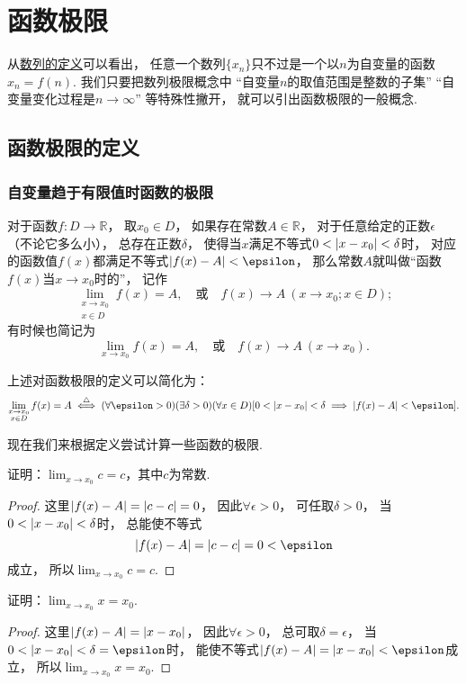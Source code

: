 \section{函数极限}
从\hyperref[definition:数列.数列的定义]{数列的定义}可以看出，
任意一个数列\(\{x_n\}\)只不过是一个以\(n\)为自变量的函数\(x_n = f(n)\).
我们只要把数列极限概念中
“自变量\(n\)的取值范围是整数的子集”
“自变量变化过程是\(n\to\infty\)”
等特殊性撇开，
就可以引出函数极限的一般概念.

\subsection{函数极限的定义}
\subsubsection*{自变量趋于有限值时函数的极限}
\begin{definition}\label{definition:极限.函数极限的定义1}
对于函数\(f\colon D\to\mathbb{R}\)，
取\(x_0 \in D\)，
如果存在常数\(A\in\mathbb{R}\)，
对于任意给定的正数\(\epsilon\)（不论它多么小），
总存在正数\(\delta\)，
使得当\(x\)满足不等式\(0 < \abs{x-x_0} < \delta\)时，
对应的函数值\(f(x)\)都满足不等式\(\abs{f(x)-A}<\epsilon\)，
那么常数\(A\)就叫做“函数\(f(x)\)当\(x \to x_0\)时的”，
记作
\[
	\lim_{\substack{x \to x_0 \\ x \in D}} f(x) = A,
	\quad\text{或}\quad
	f(x) \to A\ (x \to x_0; x \in D);
\]
有时候也简记为
\[
	\lim_{x \to x_0} f(x) = A,
	\quad\text{或}\quad
	f(x) \to A\ (x \to x_0).
\]
\end{definition}

上述对函数极限的定义可以简化为：
\[
	\lim_{\substack{x \to x_0 \\ x \in D}} f(x) = A
	\defiff
	(\forall \epsilon > 0)
	(\exists \delta > 0)
	(\forall x \in D)
	[0 < \abs{x - x_0} < \delta \implies \abs{f(x) - A} < \epsilon].
\]

现在我们来根据定义尝试计算一些函数的极限.
\begin{example}
证明：\(\lim_{x \to x_0} c = c\)，其中\(c\)为常数.
\begin{proof}
这里\(\abs{f(x) - A} = \abs{c - c} = 0\)，
因此\(\forall \epsilon > 0\)，
可任取\(\delta > 0\)，
当\(0 < \abs{x - x_0} < \delta\)时，
总能使不等式\[
	\abs{f(x) - A} = \abs{c - c} = 0 < \epsilon
\]成立，
所以\(\lim_{x \to x_0} c = c\).
\end{proof}
\end{example}

\begin{example}
证明：\(\lim_{x \to x_0} x = x_0\).
\begin{proof}
这里\(\abs{f(x) - A} = \abs{x - x_0}\)，
因此\(\forall \epsilon > 0\)，
总可取\(\delta = \epsilon\)，
当\(0 < \abs{x - x_0} < \delta = \epsilon\)时，
能使不等式\(\abs{f(x) - A} = \abs{x - x_0} < \epsilon\)成立，
所以\(\lim_{x \to x_0} x = x_0\).
\end{proof}
\end{example}

